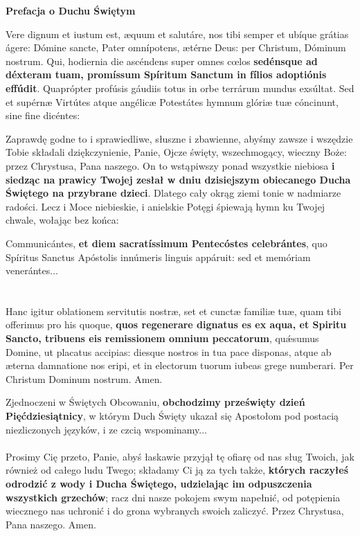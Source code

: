 \documentclass[10pt,a5paper]{book}
\newcommand{\kol}{black}
\newcommand{\rubric}[1]{\medskip{\bfseries\color{\kol} #1}\medskip}
\newcommand{\oremus}[3]{\medskip\centerline{\textbf{#1}}\medskip
	\begin{sloppypar}
		\begin{paracol}{2}
			\setlength{\columnsep}{0em}
			\begin{leftcolumn}
				#2
			\end{leftcolumn}
			\begin{rightcolumn}
				#3
			\end{rightcolumn}
		\end{paracol}
	\end{sloppypar}}
\newcommand{\oremuss}[2]{
	\begin{sloppypar}
		\begin{paracol}{2}
			\setlength{\columnsep}{0em}
			\begin{leftcolumn}
				#1
			\end{leftcolumn}
			\begin{rightcolumn}
				#2
			\end{rightcolumn}
		\end{paracol}
	\end{sloppypar}}
\begin{document}
					\oremus{Prefacja o Duchu Świętym}{
						Vere dignum et iustum est, æquum et salutáre, nos tibi semper et ubíque grátias ágere: Dómine sancte, Pater omnípotens, ætérne Deus: per Christum, Dóminum nostrum. Qui, hodiernia die ascéndens super omnes c\oe los \textbf{sedénsque ad déxteram tuam, promíssum Spíritum Sanctum in fílios adoptiónis effúdit}. Quaprópter profúsis gáudiis totus in orbe terrárum mundus exsúltat. Sed et supérnæ Virtútes atque angélicæ Potestátes hymnum glóriæ tuæ cóncinunt, sine fine dicéntes:}{
						Zaprawdę godne to i sprawiedliwe, słuszne i zbawienne, abyśmy zawsze i wszędzie Tobie składali dziękczynienie, Panie, Ojcze święty, wszechmogący, wieczny Boże: przez Chrystusa, Pana naszego. On to wstąpiwszy ponad wszystkie niebiosa \textbf{i siedząc na prawicy Twojej zesłał w dniu dzisiejszym obiecanego Ducha Świętego na przybrane dzieci}. Dlatego cały okrąg ziemi tonie w nadmiarze radości. Lecz i Moce niebieskie, i anielskie Potęgi śpiewają hymn ku Twojej chwale, wołając bez końca:}
					
					\rubric{W Kanonie następujące modlitwy ulegają zmianie:}
					
					\oremuss{
						Communicántes, \textbf{et diem sacratíssimum Pentecóstes celebrántes}, quo Spíritus Sanctus Apóstolis innúmeris linguis appáruit: sed et memóriam venerántes...\\ \\  \\
						Hanc igitur oblationem servitutis nostræ, set et cunctæ familiæ tuæ, quam tibi offerimus pro his quoque, \textbf{quos regenerare dignatus es ex aqua, et Spiritu Sancto, tribuens eis remissionem omnium peccatorum}, quǽsumus Domine, ut placatus accipias: diesque nostros in tua pace disponas, atque ab æterna damnatione nos eripi, et in electorum tuorum iubeas grege numberari. Per Christum Dominum nostrum. Amen.}{
						Zjednoczeni w Świętych Obcowaniu, \textbf{obchodzimy prześwięty dzień Pięćdziesiątnicy}, w którym Duch Święty ukazał się Apostołom pod postacią niezliczonych języków, i ze czcią wspominamy...\\ \\
						Prosimy Cię przeto, Panie, abyś łaskawie przyjął tę ofiarę od nas sług Twoich, jak również od całego ludu Twego; składamy Ci ją za tych także, \textbf{których raczyłeś odrodzić z wody i Ducha Świętego, udzielając im odpuszczenia wszystkich grzechów}; racz dni nasze pokojem swym napełnić, od potępienia wiecznego nas uchronić i do grona wybranych swoich zaliczyć. Przez Chrystusa, Pana naszego. Amen.
					}
				
\end{document}
